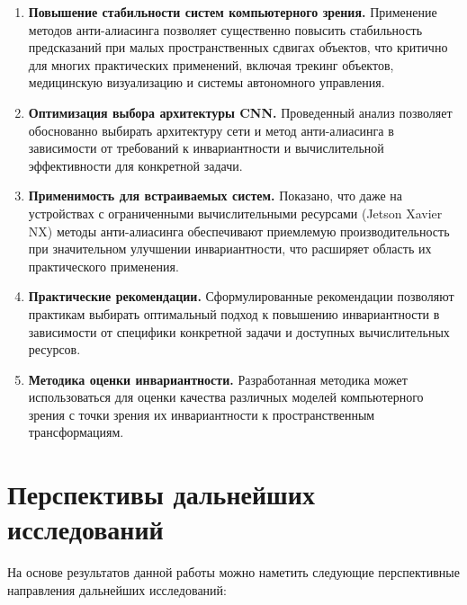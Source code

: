 \begin{enumerate}
    \item \textbf{Повышение стабильности систем компьютерного зрения.} Применение методов анти-алиасинга позволяет существенно повысить стабильность предсказаний при малых пространственных сдвигах объектов, что критично для многих практических применений, включая трекинг объектов, медицинскую визуализацию и системы автономного управления.
    
    \item \textbf{Оптимизация выбора архитектуры CNN.} Проведенный анализ позволяет обоснованно выбирать архитектуру сети и метод анти-алиасинга в зависимости от требований к инвариантности и вычислительной эффективности для конкретной задачи.
    
    \item \textbf{Применимость для встраиваемых систем.} Показано, что даже на устройствах с ограниченными вычислительными ресурсами (Jetson Xavier NX) методы анти-алиасинга обеспечивают приемлемую производительность при значительном улучшении инвариантности, что расширяет область их практического применения.
    
    \item \textbf{Практические рекомендации.} Сформулированные рекомендации позволяют практикам выбирать оптимальный подход к повышению инвариантности в зависимости от специфики конкретной задачи и доступных вычислительных ресурсов.
    
    \item \textbf{Методика оценки инвариантности.} Разработанная методика может использоваться для оценки качества различных моделей компьютерного зрения с точки зрения их инвариантности к пространственным трансформациям.
\end{enumerate}

\section{Перспективы дальнейших исследований}
\label{conclusion:perspectives}

На основе результатов данной работы можно наметить следующие перспективные направления дальнейших исследований:

